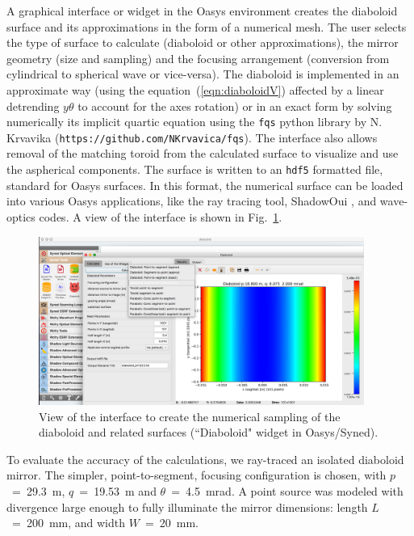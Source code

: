 \documentclass[preprint]{iucr}       %
\begin{document}
A graphical interface or widget in the Oasys environment creates the diaboloid surface and its approximations in the form of a numerical mesh. The user selects the type of surface to calculate (diaboloid or other approximations), the mirror geometry (size and sampling) and the focusing arrangement (conversion from cylindrical to spherical wave or vice-versa). 
The diaboloid is implemented in an approximate way (using the equation~(\ref{eqn:diaboloidV}) affected by a linear detrending $y\theta$ to account for the axes rotation) or in an exact form by solving numerically its implicit quartic equation \cite{val2021} using the {\tt fqs} python library by N. Krvavika ({\tt https://github.com/NKrvavica/fqs}). 
The interface also allows removal of the matching toroid from the calculated surface to visualize and use the aspherical components. The surface is written to an {\tt hdf5} formatted file, standard for Oasys surfaces. In this format, the numerical surface can be loaded into various Oasys applications, like the ray tracing tool, ShadowOui \cite{codeSHADOWOUI}, and wave-optics codes. A view of the interface is shown in Fig.~\ref{fig:widget}.

\begin{figure}\label{fig:widget}
\centering
\includegraphics[width=0.95\textwidth]{figures/widget.png}
\caption{View of the interface to create the numerical sampling of the diaboloid and related surfaces (``Diaboloid" widget in Oasys/Syned).}
\end{figure}

To evaluate the accuracy of the calculations, we ray-traced an isolated diaboloid mirror. The simpler, point-to-segment, focusing configuration is chosen, with $p$~=~\SI{29.3}{\meter}, $q$~=~\SI{19.53}{\meter} and $\theta$~=~\SI{4.5}{\milli\radian}. A point source was modeled with divergence large enough to fully illuminate the mirror dimensions: length $L$~=~\SI{200}{\milli\meter}, and width $W$~=~\SI{20}{\milli\meter}.
\end{document}
